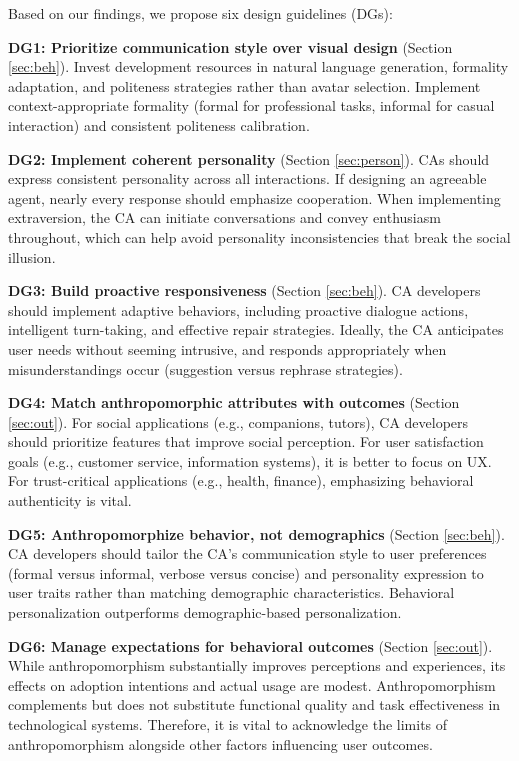 \documentclass[manuscript,anonymous,sigconf]{acmart}
\begin{document}
Based on our findings, we propose six design guidelines (DGs):

\textbf{DG1: Prioritize communication style over visual design} (Section \ref{sec:beh}). Invest development resources in natural language generation, formality adaptation, and politeness strategies rather than avatar selection. Implement context-appropriate formality (formal for professional tasks, informal for casual interaction) and consistent politeness calibration.

\textbf{DG2: Implement coherent personality} (Section \ref{sec:person}). CAs should express consistent personality across all interactions. If designing an agreeable agent, nearly every response should emphasize cooperation. When implementing extraversion, the CA can initiate conversations and convey enthusiasm throughout, which can help avoid personality inconsistencies that break the social illusion.

\textbf{DG3: Build proactive responsiveness} (Section \ref{sec:beh}). CA developers should implement adaptive behaviors, including proactive dialogue actions, intelligent turn-taking, and effective repair strategies. Ideally, the CA anticipates user needs without seeming intrusive, and responds appropriately when misunderstandings occur (suggestion versus rephrase strategies).

\textbf{DG4: Match anthropomorphic attributes with outcomes} (Section \ref{sec:out}). For social applications (e.g., companions, tutors), CA developers should prioritize features that improve social perception. For user satisfaction goals (e.g., customer service, information systems), it is better to focus on UX. For trust-critical applications (e.g., health, finance), emphasizing behavioral authenticity is vital.

\textbf{DG5: Anthropomorphize behavior, not demographics} (Section \ref{sec:beh}). CA developers should tailor the CA's communication style to user preferences (formal versus informal, verbose versus concise) and personality expression to user traits rather than matching demographic characteristics. Behavioral personalization outperforms demographic-based personalization.

\textbf{DG6: Manage expectations for behavioral outcomes} (Section \ref{sec:out}). While anthropomorphism substantially improves perceptions and experiences, its effects on adoption intentions and actual usage are modest. Anthropomorphism complements but does not substitute functional quality and task effectiveness in technological systems. Therefore, it is vital to acknowledge the limits of anthropomorphism alongside other factors influencing user outcomes.
\end{document}
